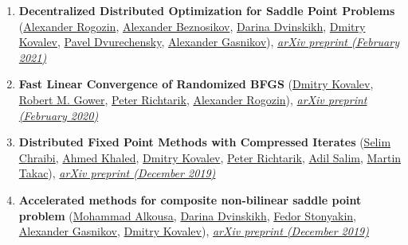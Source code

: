 \begin{enumerate}
\item \textbf{Decentralized Distributed Optimization for Saddle Point Problems} (\href{https://scholar.google.com/citations?user=sEjyzkgAAAAJ}{\color{linkcolour}Alexander Rogozin}, \href{https://anbeznosikov.github.io}{\color{linkcolour}Alexander Beznosikov}, \href{https://scholar.google.com/citations?user=5ILnTRsAAAAJ}{\color{linkcolour}Darina Dvinskikh}, \href{https://www.dmitry-kovalev.com}{\color{linkcolour}Dmitry Kovalev}, \href{http://wias-berlin.de/people/dvureche/}{\color{linkcolour}Pavel Dvurechensky}, \href{https://scholar.google.ru/citations?user=AmeE8qkAAAAJ}{\color{linkcolour}Alexander Gasnikov}), \href{https://arxiv.org/abs/2102.07758}{\em \color{black}arXiv preprint (February 2021)}
\item \textbf{Fast Linear Convergence of Randomized BFGS} (\href{https://www.dmitry-kovalev.com}{\color{linkcolour}Dmitry Kovalev}, \href{https://gowerrobert.github.io}{\color{linkcolour}Robert M. Gower}, \href{https://richtarik.org}{\color{linkcolour}Peter Richtarik}, \href{https://scholar.google.com/citations?user=sEjyzkgAAAAJ}{\color{linkcolour}Alexander Rogozin}), \href{https://arxiv.org/abs/2002.11337}{\em \color{black}arXiv preprint (February 2020)}
\item \textbf{Distributed Fixed Point Methods with Compressed Iterates} (\href{https://scholar.google.com/citations?user=gyiubRkAAAAJ}{\color{linkcolour}Selim Chraibi}, \href{https://rka97.github.io}{\color{linkcolour}Ahmed Khaled}, \href{https://www.dmitry-kovalev.com}{\color{linkcolour}Dmitry Kovalev}, \href{https://richtarik.org}{\color{linkcolour}Peter Richtarik}, \href{https://adil-salim.github.io}{\color{linkcolour}Adil Salim}, \href{https://mtakac.com}{\color{linkcolour}Martin Takac}), \href{https://arxiv.org/abs/1912.09925}{\em \color{black}arXiv preprint (December 2019)}
\item \textbf{Accelerated methods for composite non-bilinear saddle point problem} (\href{https://scholar.google.com/citations?user=dJgWojUAAAAJ}{\color{linkcolour}Mohammad Alkousa}, \href{https://scholar.google.com/citations?user=5ILnTRsAAAAJ}{\color{linkcolour}Darina Dvinskikh}, \href{https://www.researchgate.net/profile/Fedor_Stonyakin}{\color{linkcolour}Fedor Stonyakin}, \href{https://scholar.google.ru/citations?user=AmeE8qkAAAAJ}{\color{linkcolour}Alexander Gasnikov}, \href{https://www.dmitry-kovalev.com}{\color{linkcolour}Dmitry Kovalev}), \href{https://arxiv.org/abs/1906.03620}{\em \color{black}arXiv preprint (December 2019)}
\end{enumerate}
